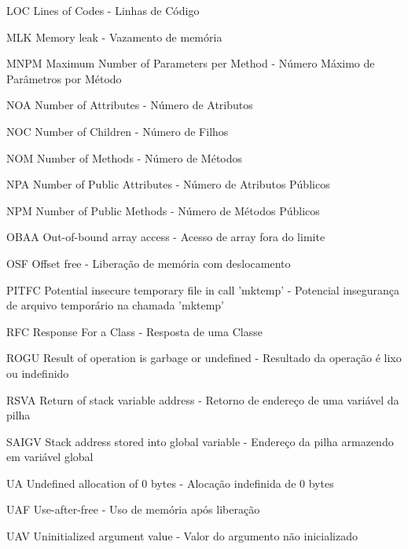 \begin{siglas}
  \item[LOC] Lines of Codes - Linhas de Código
  \item[MLK] Memory leak - Vazamento de memória
  \item[MNPM] Maximum Number of Parameters per Method - Número Máximo de Parâmetros por Método
  \item[NOA] Number of Attributes - Número de Atributos
  \item[NOC] Number of Children - Número de Filhos
  \item[NOM] Number of Methods - Número de Métodos
  \item[NPA] Number of Public Attributes - Número de Atributos Públicos
  \item[NPM] Number of Public Methods - Número de Métodos Públicos
  \item[OBAA] Out-of-bound array access - Acesso de array fora do limite
  \item[OSF] Offset free - Liberação de memória com deslocamento
  \item[PITFC] Potential insecure temporary file in call 'mktemp' - Potencial insegurança de arquivo temporário na chamada 'mktemp'
  \item[RFC] Response For a Class - Resposta de uma Classe
  \item[ROGU] Result of operation is garbage or undefined - Resultado da operação é lixo ou indefinido
  \item[RSVA] Return of stack variable address - Retorno de endereço de uma variável da pilha
  \item[SAIGV] Stack address stored into global variable - Endereço da pilha armazendo em variável global
  \item[UA] Undefined allocation of 0 bytes - Alocação indefinida de 0 bytes
  \item[UAF] Use-after-free - Uso de memória após liberação
  \item[UAV] Uninitialized argument value - Valor do argumento não inicializado
\end{siglas}
